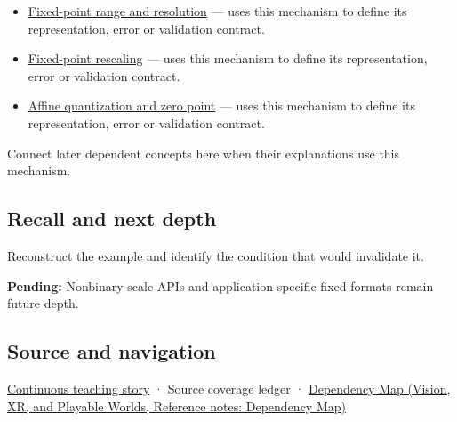 \begin{itemize}
\tightlist
\item
  \hyperref[appendix-ceb4c4a9b5a1]{Fixed-point range and resolution} --- uses this mechanism to define its representation, error or validation contract.
\item
  \hyperref[appendix-3333db47830f]{Fixed-point rescaling} --- uses this mechanism to define its representation, error or validation contract.
\item
  \hyperref[appendix-d5da3eaabaef]{Affine quantization and zero point} --- uses this mechanism to define its representation, error or validation contract.
\end{itemize}

Connect later dependent concepts here when their explanations use this mechanism.

\subsection{Recall and next depth}\label{appendix-1d0dbe8924cc-recall-and-next-depth}

\hypertarget{appendix-1d0dbe8924cc-recall-and-next-depth}{}

Reconstruct the example and identify the condition that would invalidate it.

\textbf{Pending:} Nonbinary scale APIs and application-specific fixed formats remain future depth.

\subsection{Source and navigation}\label{appendix-1d0dbe8924cc-source-and-navigation}

\hypertarget{appendix-1d0dbe8924cc-source-and-navigation}{}

\hyperref[01-foundations-i-ch001-choosing-what-information-to-keep]{Continuous teaching story} · {Source coverage ledger} · \href{../07-Vision-XR-and-Playable-Worlds/main.pdf\#nameddest=appendix-4ad47bdd269a}{Dependency Map (Vision, XR, and Playable Worlds, Reference notes: Dependency Map)}
